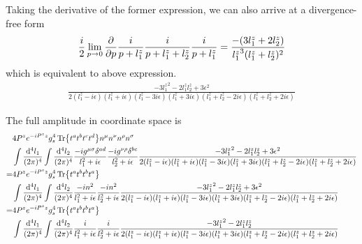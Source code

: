 \documentclass{article}
\DeclarePairedDelimiter\bracketM{[}{]}
\let\bqty\relax
\newcommand{\bqty}[1]{\bracketM*{#1}}
\newcommand{\mm}[1]{\frac{\dd^4#1}{(2\pi)^4}}
\begin{document}
Taking the derivative of the former expression, we can also arrive at a divergence-free form
\begin{align*}
	\frac{i}{2}\lim_{p\to0}\pdv{p}\bqty{\frac{i}{p+l_1^z}\frac{i}{p+l_1^z+l_2^z}\frac{i}{p+l_1^z}}= \frac{-\pqty{3l_1^z+2l_2^z}}{{l_1^z}^3(l_1^z+l_2^z)^2}
\end{align*}
which is equivalent to above expression. 
\begin{align*}
	\frac{-3 {l_1^z}^2-2 {l_1^z} {l_2^z}+3 \epsilon ^2}{2({l_1^z}-i \epsilon ) ({l_1^z}+i \epsilon ) ({l_1^z}-3 i \epsilon ) ({l_1^z}+3 i \epsilon ) ({l_1^z}+{l_2^z}-2 i \epsilon ) ({l_1^z}+{l_2^z}+2 i \epsilon )}
\end{align*}

The full amplitude in coordinate space is
\begin{align}
	&\begin{aligned}[t]
		&4P^ze^{-iP^zz}g_s^4\Tr{t^at^bt^ct^d}n^{\mu}n^{\nu}n^{\rho}n^{\sigma}\\&\int\mm{l_1}\int\mm{l_2}\frac{-ig^{\mu\sigma}\delta^{ad}}{l_1^2+i\epsilon}\frac{-ig^{\nu\rho}\delta^{bc}}{l_2^2+i\epsilon}\frac{-3 {l_1^z}^2-2 {l_1^z} {l_2^z}+3 \epsilon ^2}{2({l_1^z}-i \epsilon ) ({l_1^z}+i \epsilon ) ({l_1^z}-3 i \epsilon ) ({l_1^z}+3 i \epsilon ) ({l_1^z}+{l_2^z}-2 i \epsilon ) ({l_1^z}+{l_2^z}+2 i \epsilon )}
	\end{aligned}\\
	=&\begin{aligned}[t]
		&4P^ze^{-iP^zz}g_s^4\Tr{t^at^bt^bt^a}\\&\int\mm{l_1}\int\mm{l_2}\frac{-in^2}{l_1^2+i\epsilon}\frac{-in^2}{l_2^2+i\epsilon}\frac{-3 {l_1^z}^2-2 {l_1^z} {l_2^z}+3 \epsilon ^2}{2({l_1^z}-i \epsilon ) ({l_1^z}+i \epsilon ) ({l_1^z}-3 i \epsilon ) ({l_1^z}+3 i \epsilon ) ({l_1^z}+{l_2^z}-2 i \epsilon ) ({l_1^z}+{l_2^z}+2 i \epsilon )}
	\end{aligned}\\
	=&\begin{aligned}[t]
		&4P^ze^{-iP^zz}g_s^4\Tr{t^at^bt^bt^a}\\&\int\mm{l_1}\int\mm{l_2}\frac{i}{l_1^2+i\epsilon}\frac{i}{l_2^2+i\epsilon}\frac{-3 {l_1^z}^2-2 {l_1^z} {l_2^z}}{2({l_1^z}-i \epsilon ) ({l_1^z}+i \epsilon ) ({l_1^z}-3 i \epsilon ) ({l_1^z}+3 i \epsilon ) ({l_1^z}+{l_2^z}-2 i \epsilon ) ({l_1^z}+{l_2^z}+2 i \epsilon )}
	\end{aligned}
\end{align}
\end{document}
